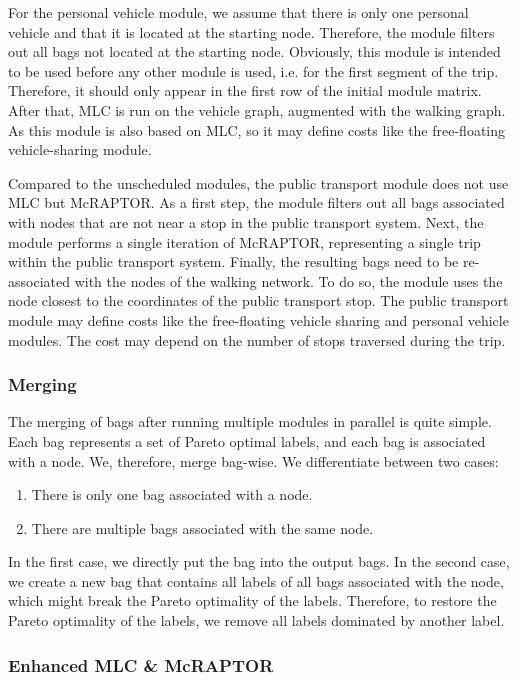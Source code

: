 For the personal vehicle module, we assume that there is only one personal vehicle and that it is located at the starting node.
Therefore, the module filters out all bags not located at the starting node.
Obviously, this module is intended to be used before any other module is used, i.e. for the first segment of the trip.
Therefore, it should only appear in the first row of the initial module matrix.
After that, MLC is run on the vehicle graph, augmented with the walking graph.
As this module is also based on MLC, so it may define costs like the free-floating vehicle-sharing module.

Compared to the unscheduled modules, the public transport module does not use MLC but McRAPTOR.
As a first step, the module filters out all bags associated with nodes that are not near a stop in the public transport system.
Next, the module performs a single iteration of McRAPTOR, representing a single trip within the public transport system.
Finally, the resulting bags need to be re-associated with the nodes of the walking network.
To do so, the module uses the node closest to the coordinates of the public transport stop.
The public transport module may define costs like the free-floating vehicle sharing and personal vehicle modules.
The cost may depend on the number of stops traversed during the trip.

\subsubsection{Merging}
\label{subsubsec:merging}

The merging of bags after running multiple modules in parallel is quite simple.
Each bag represents a set of Pareto optimal labels, and each bag is associated with a node.
We, therefore, merge bag-wise.
We differentiate between two cases:
\begin{enumerate}
    \item There is only one bag associated with a node.
    \item There are multiple bags associated with the same node.
\end{enumerate}
In the first case, we directly put the bag into the output bags.
In the second case, we create a new bag that contains all labels of all bags associated with the node, which might break the Pareto optimality of the labels.
Therefore, to restore the Pareto optimality of the labels, we remove all labels dominated by another label.

\subsubsection{Enhanced MLC \& McRAPTOR}
\label{subsubsec:enhanced_mlc_and_mcraptor}

